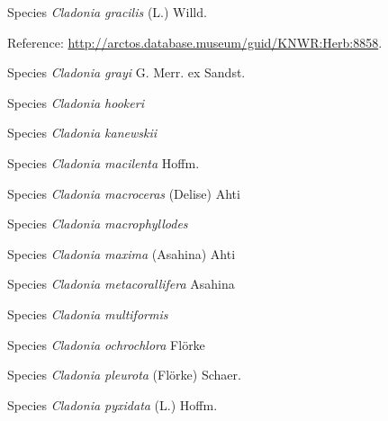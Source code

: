 \documentclass[9pt, article]{memoir}
\begin{document}
\begin{multicols}{2}
\vspace{6pt}\noindent\hspace{36pt}Species \textit{Cladonia gracilis} (L.) Willd.


\vspace{6pt}Reference: 
\url{http://arctos.database.museum/guid/KNWR:Herb:8858}.

\vspace{6pt}\noindent\hspace{36pt}Species \textit{Cladonia grayi} G. Merr. ex Sandst.


\vspace{6pt}\noindent\hspace{36pt}Species \textit{Cladonia hookeri}


\vspace{6pt}\noindent\hspace{36pt}Species \textit{Cladonia kanewskii}


\vspace{6pt}\noindent\hspace{36pt}Species \textit{Cladonia macilenta} Hoffm.


\vspace{6pt}\noindent\hspace{36pt}Species \textit{Cladonia macroceras} (Delise) Ahti


\vspace{6pt}\noindent\hspace{36pt}Species \textit{Cladonia macrophyllodes}


\vspace{6pt}\noindent\hspace{36pt}Species \textit{Cladonia maxima} (Asahina) Ahti


\vspace{6pt}\noindent\hspace{36pt}Species \textit{Cladonia metacorallifera} Asahina


\vspace{6pt}\noindent\hspace{36pt}Species \textit{Cladonia multiformis}


\vspace{6pt}\noindent\hspace{36pt}Species \textit{Cladonia ochrochlora} Flörke


\vspace{6pt}\noindent\hspace{36pt}Species \textit{Cladonia pleurota} (Flörke) Schaer.


\vspace{6pt}\noindent\hspace{36pt}Species \textit{Cladonia pyxidata} (L.) Hoffm.



\end{multicols}
\end{document}
